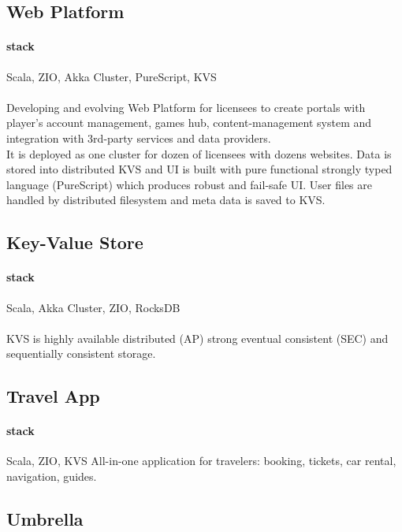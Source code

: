 \subsection{Web Platform}
\paragraph{stack} Scala, ZIO, Akka Cluster, PureScript, KVS
\paragraph{}
Developing and evolving Web Platform for licensees to create portals with player's account management, games hub, content-management system and integration with 3rd-party services and data providers.\\
It is deployed as one cluster for dozen of licensees with dozens websites. Data is stored into distributed KVS and UI is built with pure functional strongly typed language (PureScript) which produces robust and fail-safe UI. User files are handled by distributed filesystem and meta data is saved to KVS.

\subsection{Key-Value Store}
\paragraph{stack} Scala, Akka Cluster, ZIO, RocksDB
\paragraph{}
KVS is highly available distributed (AP) strong eventual consistent (SEC) and sequentially consistent storage.

\subsection{Travel App}
\paragraph{stack} Scala, ZIO, KVS
All-in-one application for travelers: booking, tickets, car rental, navigation, guides.

\subsection{Umbrella}

